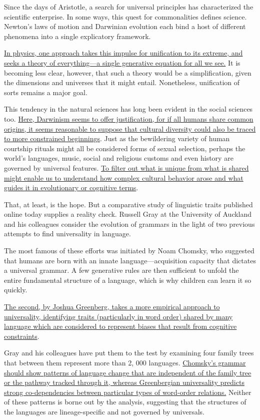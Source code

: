 \TiGanSpace


Since the days of Aristotle, a search for universal principles has
characterized the scientific enterprise. In some ways, this quest for
commonalities defines science. Newton's laws of motion and Darwinian
evolution each bind a host of different phenomena into a single
explicatory framework.

\transnum \uline{In physics, one approach takes this impulse for
	unification to its extreme, and seeks a theory of everything---a
	single generative equation for all we see.} It is becoming less clear,
however, that such a theory would be a simplification, given the
dimensions and universes that it might entail. Nonetheless, unification
of sorts remains a major goal.

This tendency in the natural sciences has long been evident in the
social sciences too. \transnum \uline{Here, Darwinism seems to offer
	justification, for if all humans share common origins, it seems
	reasonable to suppose that cultural diversity could also be traced to
	more constrained beginnings}. Just as the bewildering variety of human
courtship rituals might all be considered forms of sexual selection,
perhaps the world's languages, music, social and religious customs and
even history are governed by universal features. \transnum \uline{To
	filter out what is unique from what is shared might enable us to
	understand how complex cultural behavior arose and what guides it in
	evolutionary or cognitive terms}.

That, at least, is the hope. But a comparative study of linguistic
traits published online today supplies a reality check. Russell Gray at
the University of Auckland and his colleagues consider the evolution of
grammars in the light of two previous attempts to find universality in
language.

The most famous of these efforts was initiated by Noam Chomsky, who
suggested that humans are born with an innate language---acquisition
capacity that dictates a universal grammar. A few generative rules are
then sufficient to unfold the entire fundamental structure of a
language, which is why children can learn it so quickly.

\transnum \uline{The second, by Joshua Greenberg, takes a more empirical
	approach to universality, identifying traits (particularly in word
	order) shared by many language which are considered to represent biases
	that result from cognitive constraints}.

Gray and his colleagues have put them to the test by examining four
family trees that between them represent more than 2, 000 languages.
\transnum \uline{Chomsky's grammar should show patterns of language change
	that are independent of the family tree or the pathway tracked through
	it, whereas Greenbergian universality predicts strong co-dependencies
	between particular types of word-order relations.} Neither of these
patterns is borne out by the analysis, suggesting that the structures of
the languages are lineage-specific and not governed by universals.




